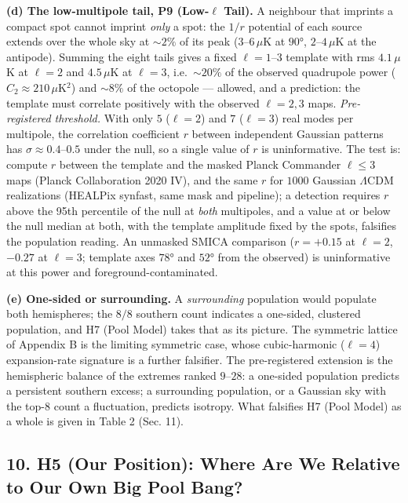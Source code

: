 \documentclass[
]{article}
\begin{document}
\textbf{(d) The low-multipole tail, P9 (Low-\(\ell\) Tail).} A neighbour
that imprints a compact spot cannot imprint \emph{only} a spot: the
\(1/r\) potential of each source extends over the whole sky at
\(\sim\!2\%\) of its peak (\(3\)--\(6\,\mu\)K at \(90°\),
\(2\)--\(4\,\mu\)K at the antipode). Summing the eight tails gives a
fixed \(\ell = 1\)--\(3\) template with rms \(4.1\,\mu\)K at \(\ell=2\)
and \(4.5\,\mu\)K at \(\ell=3\), i.e.~\(\sim\!20\%\) of the observed
quadrupole power (\(C_2 \approx 210\,\mu\)K\(^2\)) and \(\sim\!8\%\) of
the octopole --- allowed, and a prediction: the template must correlate
positively with the observed \(\ell = 2, 3\) maps. \emph{Pre-registered
threshold.} With only \(5\) (\(\ell=2\)) and \(7\) (\(\ell=3\)) real
modes per multipole, the correlation coefficient \(r\) between
independent Gaussian patterns has \(\sigma \approx 0.4\)--\(0.5\) under
the null, so a single value of \(r\) is uninformative. The test is:
compute \(r\) between the template and the masked Planck Commander
\(\ell \le 3\) maps (Planck Collaboration 2020 IV), and the same \(r\)
for \(1000\) Gaussian \(\Lambda\)CDM realizations (HEALPix synfast, same
mask and pipeline); a detection requires \(r\) above the 95th percentile
of the null at \emph{both} multipoles, and a value at or below the null
median at both, with the template amplitude fixed by the spots,
falsifies the population reading. An unmasked SMICA comparison
(\(r = +0.15\) at \(\ell=2\), \(-0.27\) at \(\ell=3\); template axes
\(78°\) and \(52°\) from the observed) is uninformative at this power
and foreground-contaminated.

\textbf{(e) One-sided or surrounding.} A \emph{surrounding} population
would populate both hemispheres; the \(8/8\) southern count indicates a
one-sided, clustered population, and H7 (Pool Model) takes that as its
picture. The symmetric lattice of Appendix B is the limiting symmetric
case, whose cubic-harmonic (\(\ell = 4\)) expansion-rate signature is a
further falsifier. The pre-registered extension is the hemispheric
balance of the extremes ranked \(9\)--\(28\): a one-sided population
predicts a persistent southern excess; a surrounding population, or a
Gaussian sky with the top-8 count a fluctuation, predicts isotropy. What
falsifies H7 (Pool Model) as a whole is given in Table 2 (Sec. 11).

\hypertarget{h5-our-position-where-are-we-relative-to-our-own-big-pool-bang}{%
\subsection{\texorpdfstring{\textbf{10. H5 (Our Position): Where Are We
Relative to Our Own Big Pool
Bang?}}{10. H5 (Our Position): Where Are We Relative to Our Own Big Pool Bang?}}\label{h5-our-position-where-are-we-relative-to-our-own-big-pool-bang}}
\end{document}
